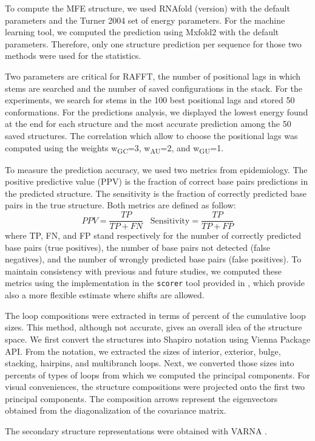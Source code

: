 \documentclass[a4paper,12pt]{article}
\begin{document}
To compute the MFE structure, we used RNAfold (version) with the default
parameters and the Turner 2004 set of energy parameters. For the machine
learning tool, we computed the prediction using Mxfold2 with the default
parameters. Therefore, only one structure prediction per sequence for those two
methods were used for the statistics.

Two parameters are critical for RAFFT, the number of positional lags in which
stems are searched and the number of saved configurations in the stack. For the
experiments, we search for stems in the 100 best positional lags and stored 50
conformations. For the predictions analysis, we displayed the lowest energy
found at the end for each structure and the most accurate prediction among the
50 saved structures. The correlation which allow to choose the positional lags
was computed using the weights w\textsubscript{GC}=3, w\textsubscript{AU}=2, and w\textsubscript{GU}=1.

To measure the prediction accuracy, we used two metrics from epidemiology. The
positive predictive value (PPV) is the fraction of correct base pairs
predictions in the predicted structure. The sensitivity is the fraction of
correctly predicted base pairs in the true structure. Both metrics are defined
as follow:
\begin{equation}
PPV = \frac{TP}{TP + FN} \;\;\; \text{Sensitivity} = \frac{TP}{TP+FP}
\end{equation}
where TP, FN, and FP stand respectively for the number of correctly predicted
base pairs (true positives), the number of base pairs not detected (false
negatives), and the number of wrongly predicted base pairs (false positives). To
maintain consistency with previous and future studies, we computed these metrics
using the implementation in the \texttt{scorer} tool provided in
\cite{mathews19_how_to_bench_rna_secon}, which provide also a more flexible
estimate where shifts are allowed.

The loop compositions were extracted in terms of percent of the cumulative loop
sizes. This method, although not accurate, gives an overall idea of the
structure space. We first convert the structures into Shapiro notation using
Vienna Package API. From the notation, we extracted the sizes of interior,
exterior, bulge, stacking, hairpins, and multibranch loops. Next, we converted
those sizes into percents of types of loops from which we computed the principal
components. For visual conveniences, the structure compositions were projected
onto the first two principal components. The composition arrows represent the
eigenvectors obtained from the diagonalization of the covariance matrix.

The secondary structure representations were obtained with VARNA \cite{darty09_varna}.



\end{document}
